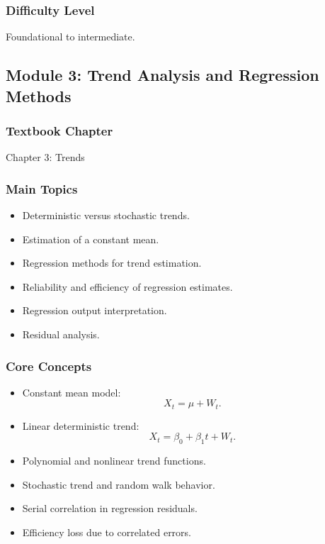 \documentclass[11pt]{article}
\begin{document}
\subsubsection*{Difficulty Level}
Foundational to intermediate.

\subsection{Module 3: Trend Analysis and Regression Methods}

\subsubsection*{Textbook Chapter}
Chapter 3: Trends

\subsubsection*{Main Topics}
\begin{itemize}
    \item Deterministic versus stochastic trends.
    \item Estimation of a constant mean.
    \item Regression methods for trend estimation.
    \item Reliability and efficiency of regression estimates.
    \item Regression output interpretation.
    \item Residual analysis.
\end{itemize}

\subsubsection*{Core Concepts}
\begin{itemize}
    \item Constant mean model:
    \[
        X_t = \mu + W_t.
    \]
    \item Linear deterministic trend:
    \[
        X_t = \beta_0 + \beta_1 t + W_t.
    \]
    \item Polynomial and nonlinear trend functions.
    \item Stochastic trend and random walk behavior.
    \item Serial correlation in regression residuals.
    \item Efficiency loss due to correlated errors.
\end{itemize}
\end{document}
